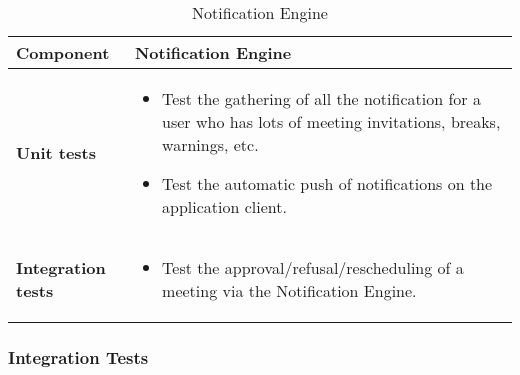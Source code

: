 \begin{table}[h]	
	\centering
	\def\arraystretch{1.5}
	\begin{tabular}{|m{4cm}|m{12cm}|}
		\hline
		\textbf{Component} & Notification Engine \\ \hline
		\textbf{Unit tests} & 
			\begin{itemize}
			\item Test the gathering of all the notification for a user who has lots of meeting invitations, breaks, warnings, etc.
			\item Test the automatic push of notifications on the application client.
			\end{itemize} \\ \hline
		\textbf{Integration tests} & 
			\begin{itemize}
			\item Test the approval/refusal/rescheduling of a meeting via the Notification Engine.
			\end{itemize} \\ \hline
	\end{tabular}
	\caption{Notification Engine}
\end{table}

\subsubsection{Integration Tests}

\clearpage